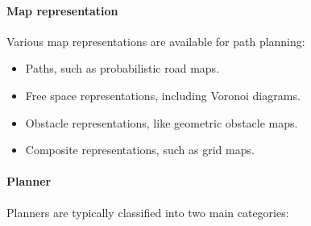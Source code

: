 \paragraph*{Map representation}
Various map representations are available for path planning:
\begin{itemize}
    \item Paths, such as probabilistic road maps.
    \item Free space representations, including Voronoi diagrams.
    \item Obstacle representations, like geometric obstacle maps.
    \item Composite representations, such as grid maps.
\end{itemize}

\paragraph*{Planner}
Planners are typically classified into two main categories:
